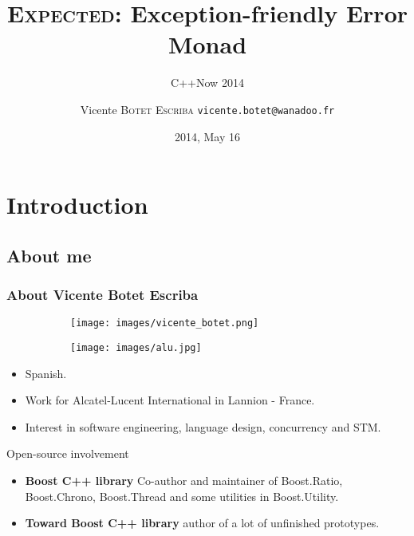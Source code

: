 \documentclass[xcolor=dvipsnames]{beamer}
\title{\textsc{Expected}: Exception-friendly Error Monad}
\subtitle{C++Now 2014}
\author[\textsc{Vicente Botet}]{Vicente \textsc{Botet Escriba} \texttt{vicente.botet@wanadoo.fr}}
\institute[Alcatel-Lucent]{Alcatel-Lucent International-Lannion}
\date[]{2014, May 16}
\begin{document}
\maketitle

\section{Introduction}

\subsection{About me}

\begin{frame}
\frametitle{About Vicente Botet Escriba}

\begin{figure}[p]
  \centering
  \begin{subfigure}[b]{0.3\textwidth}
    \texttt{[image: images/vicente\_botet.png]}
  \end{subfigure}
  \qquad \qquad \quad
  \begin{subfigure}[b]{0.3\textwidth}
    \texttt{[image: images/alu.jpg]}
  \end{subfigure}
\end{figure}

\begin{itemize}
\item Spanish.
\item Work for Alcatel-Lucent International in Lannion - France.
\item Interest in software engineering, language design, concurrency and STM.
\end{itemize}

\begin{block}{Open-source involvement}
\begin{itemize}
\item \textbf{Boost C++ library} Co-author and maintainer of Boost.Ratio, Boost.Chrono, Boost.Thread and some utilities in Boost.Utility.
\item \textbf{Toward Boost C++ library} author of a lot of unfinished prototypes.
\end{itemize}
\end{block}
\end{frame}
\end{document}
